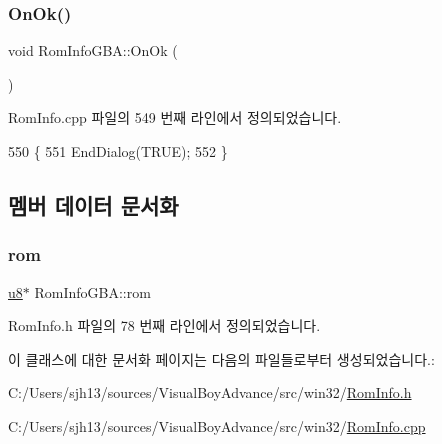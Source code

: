 \subsubsection{\texorpdfstring{On\+Ok()}{OnOk()}}
{\footnotesize\ttfamily void Rom\+Info\+G\+B\+A\+::\+On\+Ok (\begin{DoxyParamCaption}{ }\end{DoxyParamCaption})\hspace{0.3cm}{\ttfamily [protected]}}



Rom\+Info.\+cpp 파일의 549 번째 라인에서 정의되었습니다.


\begin{DoxyCode}
550 \{
551   EndDialog(TRUE);
552 \}
\end{DoxyCode}


\subsection{멤버 데이터 문서화}
\mbox{\label{class_rom_info_g_b_a_af44895da29e3b91d95cd31f3acb0eb60}} 
\subsubsection{\texorpdfstring{rom}{rom}}
{\footnotesize\ttfamily \mbox{\hyperlink{_system_8h_aed742c436da53c1080638ce6ef7d13de}{u8}}$\ast$ Rom\+Info\+G\+B\+A\+::rom}



Rom\+Info.\+h 파일의 78 번째 라인에서 정의되었습니다.



이 클래스에 대한 문서화 페이지는 다음의 파일들로부터 생성되었습니다.\+:\begin{DoxyCompactItemize}
\item 
C\+:/\+Users/sjh13/sources/\+Visual\+Boy\+Advance/src/win32/\mbox{\hyperlink{_rom_info_8h}{Rom\+Info.\+h}}\item 
C\+:/\+Users/sjh13/sources/\+Visual\+Boy\+Advance/src/win32/\mbox{\hyperlink{_rom_info_8cpp}{Rom\+Info.\+cpp}}\end{DoxyCompactItemize}
